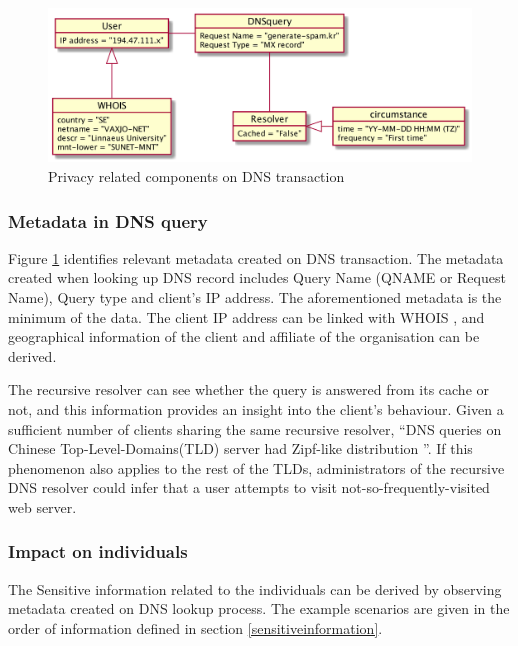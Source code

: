 \begin{figure}[ht!]
    \begin{center}
        \includegraphics*[width=\columnwidth]{img/privacyobject}
    \end{center}
    \caption{Privacy related components on DNS transaction}
    \label{privacyobject}
\end{figure}

\subsubsection{Metadata in DNS query}\label{dnsmetadata}
Figure \ref{privacyobject} identifies relevant metadata created on DNS transaction.
The metadata created when looking up DNS record includes Query Name (QNAME or Request Name), Query type and client's IP address.
The aforementioned metadata is the minimum of the data. The client IP address can be linked with WHOIS \cite{whois-icann}, and geographical information of the client and affiliate of the organisation can be derived.

The recursive resolver can see whether the query is answered from its cache or not, and this information provides an insight into the client's behaviour.
Given a sufficient number of clients sharing the same recursive resolver, ``DNS queries on Chinese Top-Level-Domains(TLD) server had Zipf-like distribution \cite{wang2013analysis}''. If this phenomenon also applies to the rest of the TLDs, administrators of the recursive DNS resolver could infer that a user attempts to visit not-so-frequently-visited web server.

\subsubsection{Impact on individuals}
The Sensitive information related to the individuals can be derived by observing metadata created on DNS lookup process. The example scenarios are given in the order of information defined in section \ref{sensitiveinformation}.

